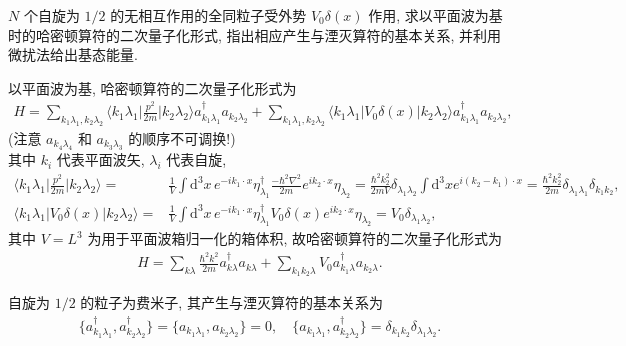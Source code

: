 \documentclass{assignment}
\begin{document}
\begin{prob}
    $N$ 个自旋为 $1/2$ 的无相互作用的全同粒子受外势 $V_0\delta(x)$ 作用, 求以平面波为基时的哈密顿算符的二次量子化形式, 指出相应产生与湮灭算符的基本关系, 并利用微扰法给出基态能量.
\end{prob}
\begin{sol}
    以平面波为基, 哈密顿算符的二次量子化形式为
    \begin{align}
        H=\sum_{k_1\lambda_1,k_2\lambda_2}\langle k_1\lambda_1\rvert \frac{p^2}{2m}\lvert k_2\lambda_2\rangle a_{k_1\lambda_1}^{\dagger}a_{k_2\lambda_2}+\sum_{k_1\lambda_1,k_2\lambda_2}\langle k_1\lambda_1\rvert V_0\delta(x)\lvert k_2\lambda_2\rangle a_{k_1\lambda_1}^{\dagger}a_{k_2\lambda_2},
    \end{align}
    (注意 $a_{k_4\lambda_4}$ 和 $a_{k_3\lambda_3}$ 的顺序不可调换!)\\
    其中 $k_i$ 代表平面波矢, $\lambda_i$ 代表自旋,
    \begin{align}
        \langle k_1\lambda_1\rvert\frac{p^2}{2m}\lvert k_2\lambda_2\rangle=&\frac{1}{V}\int\mathrm{d}^3x\,e^{-ik_1\cdot x}\eta_{\lambda_1}^{\dagger}\frac{-\hbar^2\nabla^2}{2m}e^{ik_2\cdot x}\eta_{\lambda_2}=\frac{\hbar^2k_2^2}{2mV}\delta_{\lambda_1\lambda_2}\int\mathrm{d}^3xe^{i(k_2-k_1)\cdot x}=\frac{\hbar^2k_2^2}{2m}\delta_{\lambda_1\lambda_1}\delta_{k_1k_2},\\
        \langle k_1\lambda_1\rvert V_0\delta(x)\lvert k_2\lambda_2\rangle=&\frac{1}{V}\int\mathrm{d}^3x\,e^{-ik_1\cdot x}\eta_{\lambda_1}^{\dagger}V_0\delta(x)e^{ik_2\cdot x}\eta_{\lambda_2}=V_0\delta_{\lambda_1\lambda_2},
    \end{align}
    其中 $V=L^3$ 为用于平面波箱归一化的箱体积, 故哈密顿算符的二次量子化形式为
    \begin{align}
        H=\sum_{k\lambda}\frac{\hbar^2k^2}{2m}a_{k\lambda}^{\dagger}a_{k\lambda}+\sum_{k_1k_2\lambda}V_0a_{k_1\lambda}^{\dagger}a_{k_2\lambda}.
    \end{align}

    自旋为 $1/2$ 的粒子为费米子, 其产生与湮灭算符的基本关系为
    \begin{align}
        \{a_{k_1\lambda_1}^{\dagger},a_{k_2\lambda_2}^{\dagger}\}=\{a_{k_1\lambda_1},a_{k_2\lambda_2}\}=0,\quad\{a_{k_1\lambda_1},a_{k_2\lambda_2}^{\dagger}\}=\delta_{k_1k_2}\delta_{\lambda_1\lambda_2}.
    \end{align}


\end{sol}
\end{document}
